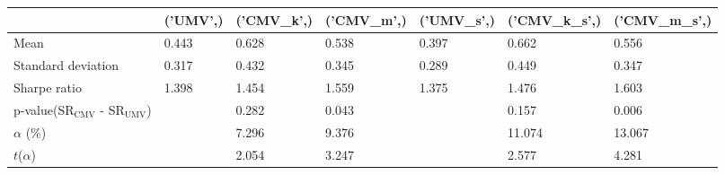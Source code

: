 \begin{tabular}{lllllll}
\toprule
 & ('UMV',) & ('CMV_k',) & ('CMV_m',) & ('UMV_s',) & ('CMV_k_s',) & ('CMV_m_s',) \\
\midrule
Mean & 0.443 & 0.628 & 0.538 & 0.397 & 0.662 & 0.556 \\
Standard deviation & 0.317 & 0.432 & 0.345 & 0.289 & 0.449 & 0.347 \\
Sharpe ratio & 1.398 & 1.454 & 1.559 & 1.375 & 1.476 & 1.603 \\
p-value(SR$_{\text{CMV}}$ - SR$_{\text{UMV}}$) &  & 0.282 & 0.043 &  & 0.157 & 0.006 \\
$\alpha$ (\%) &  & 7.296 & 9.376 &  & 11.074 & 13.067 \\
$t$($\alpha$) &  & 2.054 & 3.247 &  & 2.577 & 4.281 \\
\bottomrule
\end{tabular}
